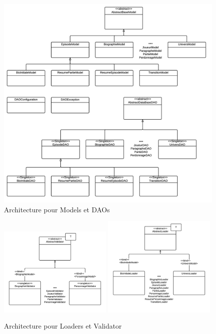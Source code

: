 \documentclass[a4paper,oneside,10pt]{article}
\begin{document}
\begin{figure}[H]
	\begin{center}
		\includegraphics[width=\textwidth]{images/logiciel/arch1.png}  
		\caption{Architecture pour Models et DAOs}
	\end{center}
\end{figure}

\begin{figure}[H]
	\begin{center}
		\includegraphics[width=0.49\textwidth]{images/logiciel/arch2.png}  
		\includegraphics[width=0.49\textwidth]{images/logiciel/arch3.png}  
		\caption{Architecture pour Loaders et Validator}
	\end{center}
\end{figure}
\end{document}
